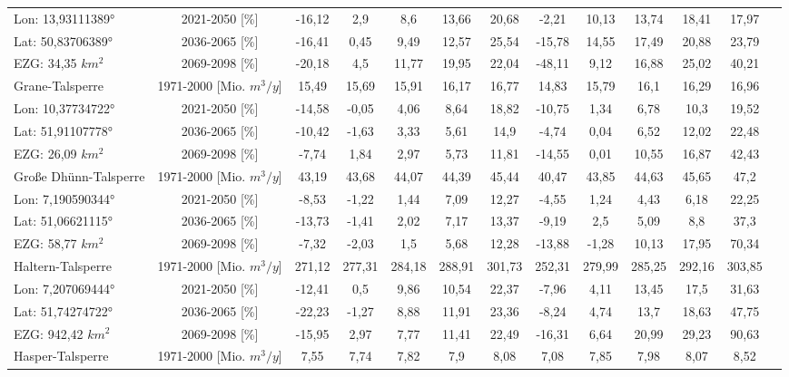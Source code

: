 \begin{longtable}{@{\extracolsep{\fill}}lc|ccccc||cccccc}
\cline{2-13} 
Lon: 13,93111389° & 2021-2050 [\%]  & -16,12 & 2,9 & 8,6 & 13,66 & 20,68 & -2,21 & 10,13 & 13,74 & 18,41 & 17,97 & \\ 
Lat: 50,83706389° & 2036-2065 [\%]  & -16,41 & 0,45 & 9,49 & 12,57 & 25,54 & -15,78 & 14,55 & 17,49 & 20,88 & 23,79 & \\ 
EZG: 34,35 $km^2$ & 2069-2098 [\%]  & -20,18 & 4,5 & 11,77 & 19,95 & 22,04 & -48,11 & 9,12 & 16,88 & 25,02 & 40,21 & \\ 
\hline 
Grane-Talsperre & 1971-2000 [Mio. $m^3/y$]  & 15,49 & 15,69 & 15,91 & 16,17 & 16,77 & 14,83 & 15,79 & 16,1 & 16,29 & 16,96 & \\ 
\cline{2-13} 
Lon: 10,37734722° & 2021-2050 [\%]  & -14,58 & -0,05 & 4,06 & 8,64 & 18,82 & -10,75 & 1,34 & 6,78 & 10,3 & 19,52 & \\ 
Lat: 51,91107778° & 2036-2065 [\%]  & -10,42 & -1,63 & 3,33 & 5,61 & 14,9 & -4,74 & 0,04 & 6,52 & 12,02 & 22,48 & \\ 
EZG: 26,09 $km^2$ & 2069-2098 [\%]  & -7,74 & 1,84 & 2,97 & 5,73 & 11,81 & -14,55 & 0,01 & 10,55 & 16,87 & 42,43 & \\ 
\hline 
Große Dhünn-Talsperre & 1971-2000 [Mio. $m^3/y$]  & 43,19 & 43,68 & 44,07 & 44,39 & 45,44 & 40,47 & 43,85 & 44,63 & 45,65 & 47,2 & \\ 
\cline{2-13} 
Lon: 7,190590344° & 2021-2050 [\%]  & -8,53 & -1,22 & 1,44 & 7,09 & 12,27 & -4,55 & 1,24 & 4,43 & 6,18 & 22,25 & \\ 
Lat: 51,06621115° & 2036-2065 [\%]  & -13,73 & -1,41 & 2,02 & 7,17 & 13,37 & -9,19 & 2,5 & 5,09 & 8,8 & 37,3 & \\ 
EZG: 58,77 $km^2$ & 2069-2098 [\%]  & -7,32 & -2,03 & 1,5 & 5,68 & 12,28 & -13,88 & -1,28 & 10,13 & 17,95 & 70,34 & \\ 
\hline 
Haltern-Talsperre & 1971-2000 [Mio. $m^3/y$]  & 271,12 & 277,31 & 284,18 & 288,91 & 301,73 & 252,31 & 279,99 & 285,25 & 292,16 & 303,85 & \\ 
\cline{2-13} 
Lon: 7,207069444° & 2021-2050 [\%]  & -12,41 & 0,5 & 9,86 & 10,54 & 22,37 & -7,96 & 4,11 & 13,45 & 17,5 & 31,63 & \\ 
Lat: 51,74274722° & 2036-2065 [\%]  & -22,23 & -1,27 & 8,88 & 11,91 & 23,36 & -8,24 & 4,74 & 13,7 & 18,63 & 47,75 & \\ 
EZG: 942,42 $km^2$ & 2069-2098 [\%]  & -15,95 & 2,97 & 7,77 & 11,41 & 22,49 & -16,31 & 6,64 & 20,99 & 29,23 & 90,63 & \\ 
\hline 
Hasper-Talsperre & 1971-2000 [Mio. $m^3/y$]  & 7,55 & 7,74 & 7,82 & 7,9 & 8,08 & 7,08 & 7,85 & 7,98 & 8,07 & 8,52 & \\ 

\end{longtable}
